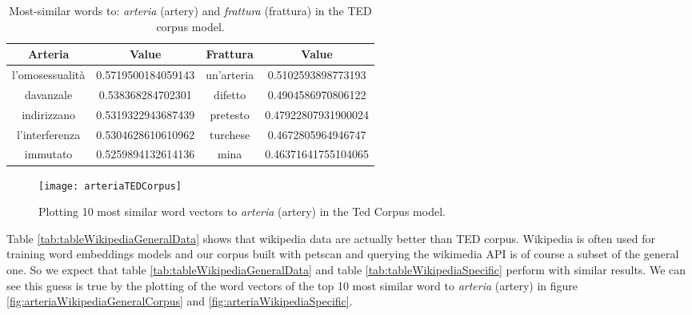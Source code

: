 \begin{table}[h!]
	\begin{center}
		\caption[General purpose - Most similar words in TED corpus model.]{Most-similar words to: \textit{arteria} (artery) and \textit{frattura} (frattura) in the TED corpus model.}
		\label{tab:tableTEDData}
		\begin{tabular}{c|S|c|S}
			\toprule
			\textbf{Arteria} & \textbf{Value} & \textbf{Frattura} & \textbf{Value} \\
			\midrule
			l'omosessualità & 0.5719500184059143 & un'arteria & 0.5102593898773193 \\
			davanzale & 0.538368284702301 & difetto & 0.4904586970806122 \\
			indirizzano & 0.5319322943687439 & pretesto & 0.47922807931900024 \\
			l'interferenza & 0.5304628610610962 & turchese & 0.4672805964946747 \\			
			immutato	& 0.5259894132614136 & mina & 0.46371641755104065 \\
			\bottomrule
		\end{tabular}
	\end{center}
\end{table}

\begin{figure}[ht]
	\centering
	\texttt{[image: arteriaTEDCorpus]}
	\caption[Artery - 10 most similar words plotted for TED Corpus model]{Plotting 10 most similar word vectors to \textit{arteria} (artery) in the Ted Corpus model.}
	\label{fig:arteriaTEDCorpus}
\end{figure}

Table \ref{tab:tableWikipediaGeneralData} shows that wikipedia data are actually better than TED corpus. Wikipedia is often used for training word embeddings models and our corpus built with petscan and querying the wikimedia API is of course a subset of the general one. So we expect that table \ref{tab:tableWikipediaGeneralData} and table \ref{tab:tableWikipediaSpecific} perform with similar results. We can see this guess is true by the plotting of the word vectors of the top 10 most similar word to \textit{arteria} (artery) in figure \ref{fig:arteriaWikipediaGeneralCorpus} and \ref{fig:arteriaWikipediaSpecific}.

